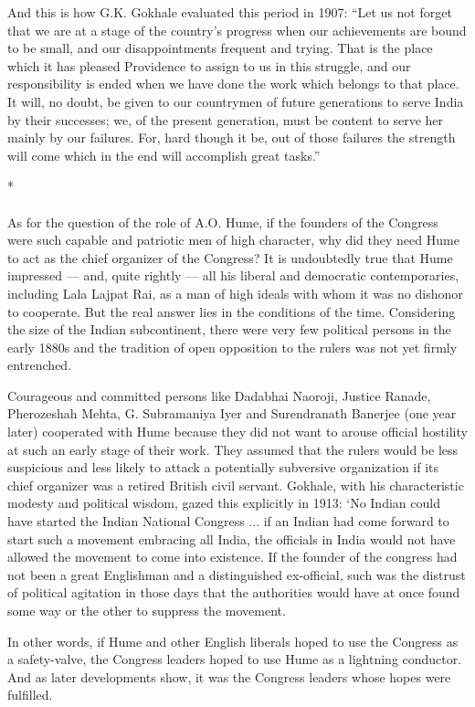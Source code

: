 And this is how G.K. Gokhale evaluated this period in 1907: ``Let us not forget that we are at a stage of the country's progress when our achievements are bound to be small, and our disappointments frequent and trying. That is the place which it has pleased Providence to assign to us in this struggle, and our responsibility is ended when we have done the work which belongs to that place. It will, no doubt, be given to our countrymen of future generations to serve India by their successes; we, of the present generation, must be content to serve her mainly by our failures. For, hard though it be, out of those failures the strength will come which in the end will accomplish great tasks.''

\begin{center}*\end{center}

\paragraph*{}

As for the question of the role of A.O. Hume, if the founders of the Congress were such capable and patriotic men of high character, why did they need Hume to act as the chief organizer of the Congress? It is undoubtedly true that Hume impressed --- and, quite rightly --- all his liberal and democratic contemporaries, including Lala Lajpat Rai, as a man of high ideals with whom it was no dishonor to cooperate. But the real answer lies in the conditions of the time. Considering the size of the Indian subcontinent, there were very few political persons in the early 1880s and the tradition of open opposition to the rulers was not yet firmly entrenched.

Courageous and committed persons like Dadabhai Naoroji, Justice Ranade, Pherozeshah Mehta, G. Subramaniya Iyer and Surendranath Banerjee (one year later) cooperated with Hume because they did not want to arouse official hostility at such an early stage of their work. They assumed that the rulers would be less suspicious and less likely to attack a potentially subversive organization if its chief organizer was a retired British civil servant. Gokhale, with his characteristic modesty and political wisdom, gazed this explicitly in 1913: `No Indian could have started the Indian National Congress ... if an Indian had come forward to start such a movement embracing all India, the officials in India would not have allowed the movement to come into existence. If the founder of the congress had not been a great Englishman and a distinguished ex-official, such was the distrust of political agitation in those days that the authorities would have at once found some way or the other to suppress the movement.

In other words, if Hume and other English liberals hoped to use the Congress as a safety-valve, the Congress leaders hoped to use Hume as a lightning conductor. And as later developments show, it was the Congress leaders whose hopes were fulfilled.
